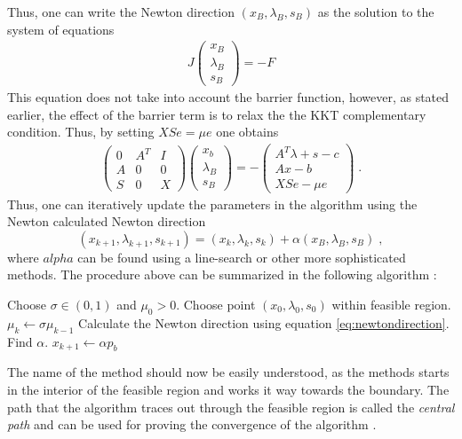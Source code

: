 Thus, one can write the Newton direction $(x_B , \lambda_B , s_B)$ as the solution to the system of equations
\begin{align}
J \begin{pmatrix}
           x_B \\
           \lambda_B \\
           s_B
         \end{pmatrix} = -F
\end{align}
This equation does not take into account the barrier function, however, as stated earlier, the effect of the barrier term is to relax the the KKT complementary condition. Thus, by setting $X S e = \mu e$ one obtains
\begin{align}
	\begin{pmatrix}
    	 0 & A^T & I    \\
         A & 0 & 0 		\\
         S & 0 & X
    \end{pmatrix} 
    \begin{pmatrix}
    	x_b 		    \\
        \lambda_B		\\
        s_B
    \end{pmatrix} =
    - \begin{pmatrix}
    	  A^T \lambda + s - c 	\\
          A x - b 				\\
          X S e - \mu e
    \end{pmatrix} \; . \label{eq:newtondirection}
\end{align}
Thus, one can iteratively update the parameters in the algorithm using the Newton calculated Newton direction
\begin{equation}
	(x_{k+1} , \lambda_{k+1} , s _{k+1}) = (x_{k} , \lambda_{k} , s _{k}) + \alpha  (x_B , \lambda_B , s_B) \; , \label{eq:newtonstep}
\end{equation}
where $alpha$ can be found using a line-search or other more sophisticated methods.
The procedure above can be summarized in the following algorithm \cite{ipnote}:\\
\begin{algorithmic}
\State Choose $\sigma \in (0,1)$ and $\mu_0 > 0$.
\State Choose point $(x_0 , \lambda_0 , s_0)$ within feasible region.
	\State $\mu_k \gets \sigma \mu_{k-1}$
	\State Calculate the Newton direction using equation \ref{eq:newtondirection}.
	\State Find $\alpha$.
	\State $x_{k+1} \gets \alpha p_b$
\EndFor
\end{algorithmic}
The name of the method should now be easily understood, as the methods starts in the interior of the feasible region and works it way towards the boundary. The path that the algorithm traces out through the feasible region is called the \textit{central path} and can be used for proving the convergence of the algorithm \cite{wright}.
